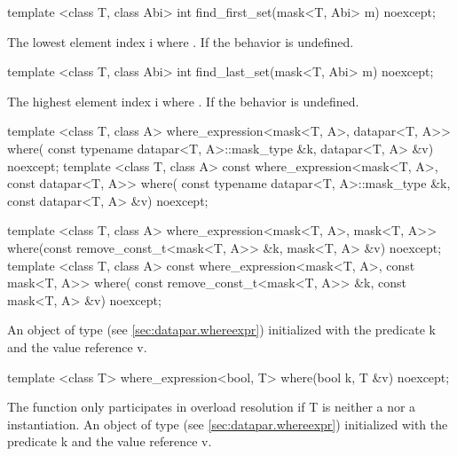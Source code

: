 \begin{itemdecl}
template <class T, class Abi> int find_first_set(mask<T, Abi> m) noexcept;
\end{itemdecl}
\begin{itemdescr}
  \pnum\returns The lowest element index \code i where .
  \pnum\remarks If  the behavior is undefined.
\end{itemdescr}

\begin{itemdecl}
template <class T, class Abi> int find_last_set(mask<T, Abi> m) noexcept;
\end{itemdecl}
\begin{itemdescr}
  \pnum\returns The highest element index \code i where .
  \pnum\remarks If  the behavior is undefined.
\end{itemdescr}

\begin{itemdecl}
template <class T, class A>
where_expression<mask<T, A>, datapar<T, A>> where(
    const typename datapar<T, A>::mask_type &k, datapar<T, A> &v) noexcept;
template <class T, class A>
const where_expression<mask<T, A>, const datapar<T, A>> where(
    const typename datapar<T, A>::mask_type &k, const datapar<T, A> &v) noexcept;

template <class T, class A>
where_expression<mask<T, A>, mask<T, A>> where(const remove_const_t<mask<T, A>> &k,
                                               mask<T, A> &v) noexcept;
template <class T, class A>
const where_expression<mask<T, A>, const mask<T, A>> where(
    const remove_const_t<mask<T, A>> &k, const mask<T, A> &v) noexcept;
\end{itemdecl}
\begin{itemdescr}
  \pnum\returns An object of type  (see \ref{sec:datapar.whereexpr}) initialized with the predicate \code k and the value reference \code v.
\end{itemdescr}

\begin{itemdecl}
template <class T> where_expression<bool, T> where(bool k, T &v) noexcept;
\end{itemdecl}
\begin{itemdescr}
  \pnum\remarks The function only participates in overload resolution if \type T is neither a \datapar nor a \mask instantiation.
  \pnum\returns An object of type  (see \ref{sec:datapar.whereexpr}) initialized with the predicate \code k and the value reference \code v.
\end{itemdescr}

